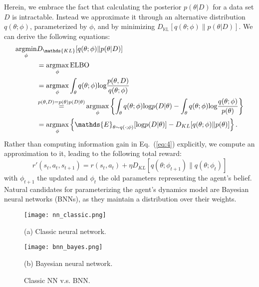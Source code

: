 \documentclass{article}
\begin{document}
	 \noindent Herein, we embrace the fact that calculating the posterior $p(\theta|D)$ for a data set $D$ is intractable. Instead we approximate it through an alternative distribution $q(\theta;\phi)$, parameterized by $\phi$, and by minimizing $D_{\mathds{KL}}[q(\theta;\phi)\|p(\theta|D)]$. We can derive the following equations:
	 \begin{align}
	 \mathop{\text{argmin}}\limits_{\phi}&D_{\mathds{KL}}[q(\theta;\phi)\|p(\theta|D)]\notag\\ &= \mathop{\text{argmax}}\limits_{\phi}{\text{ELBO}}\notag\\
	 &=\mathop{\text{argmax}}_\phi\int_{\theta}q(\theta;\phi)\text{log}\frac{p(\theta,D)}{q(\theta;\phi)}\notag\\
	 &\mathop{=}\limits^{p(\theta,D) = p(\theta)p(D|\theta)} \mathop{\text{argmax}}_{\phi}\left\{\int_{\theta} q(\theta;\phi)\text{log}p(D|\theta)-\int_{\theta} q(\theta;\phi)\text{log}\frac{q(\theta;\phi)}{p(\theta)}\right\}\notag\\
	 &= \mathop{\text{argmax}}\limits_{\phi}\left\{\mathds{E}_{\theta \sim q(\cdot;\phi)}[\text{log}p(D|\theta)]-D_{KL}[q(\theta;\phi)\|p(\theta)]\right\}.
	 \end{align}
	 \noindent Rather than computing information gain in Eq.~(\ref{eq:4}) explicitly, we compute an approximation to it, leading to the following total reward:
	 \begin{equation}
	 r'(s_t,a_t,s_{t+1}) = r(s_t,a_t) + \eta D_{KL}[q(\theta;\phi_{t+1})\|q(\theta;\phi_t)]\label{eq:7}
	 \end{equation}
	 with $\phi_{t+1}$ the updated and $\phi_t$ the old parameters representing the agent's belief. Natural candidates for parameterizing the agent's dynamics model are Bayesian neural networks (BNNs), as they maintain a distribution over their weights. 
	 	 \begin{figure}[h]
	 	 	\begin{minipage}[t]{0.5\linewidth}%
	 	 		\centering
	 	 		\texttt{[image: nn\_classic.png]}
	 	 		\caption*{(a) Classic neural network.}
	 	 	\end{minipage}\label{fig1}
	 	 	\begin{minipage}[t]{0.5\linewidth}%
	 	 		\centering
	 	 		\texttt{[image: bnn\_bayes.png]}
	 	 		\caption*{(b) Bayesian neural network.}
	 	 		\label{fig2}
	 	 	\end{minipage}
	 	 	\caption{Classic NN v.s. BNN.}\label{Fig:2}%
	 	 \end{figure}
\end{document}
